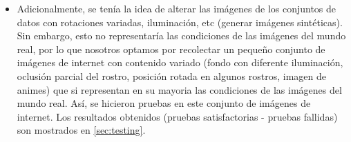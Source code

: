 \begin{itemize}
\item Adicionalmente, se tenía la idea de alterar las imágenes de los conjuntos de datos con rotaciones variadas, iluminación, etc (generar imágenes sintéticas). Sin embargo, esto no representaría las condiciones de las imágenes del mundo real, por lo que nosotros optamos por recolectar un pequeño conjunto de imágenes de internet con contenido variado (fondo con diferente iluminación, oclusión parcial del rostro, posición rotada en algunos rostros, imagen de animes) que si representan en su mayoria las condiciones de las imágenes del mundo real. Así, se  hicieron pruebas en este conjunto de imágenes de internet. Los resultados obtenidos (pruebas satisfactorias - pruebas fallidas) son mostrados en \ref{sec:testing}.

\end{itemize}
